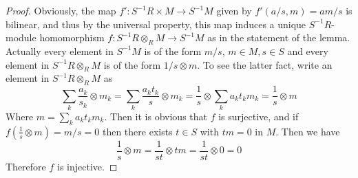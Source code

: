 \documentclass[10pt,a4paper]{amsart}
\theoremstyle{plain}
\theoremstyle{definition}
\theoremstyle{remark}
\numberwithin{equation}{subsection}
\begin{document}
\begin{proof}
Obviously, the map
$f' : S^{-1}R \times M \to S^{-1}M$ given by $f'(a/s, m) = am/s$ is
bilinear, and thus by the
universal property, this map induces a unique $S^{-1}R$-module homomorphism
$f : S^{-1}R \otimes_R M \to S^{-1}M$ as in the statement of the lemma.
Actually every element in $S^{-1}M$ is of the form $m/s$, $m\in M, s\in S$ and
every element in
$S^{-1}R \otimes_R M$ is of the form $1/s \otimes m$. To see the latter fact,
write an element in
$S^{-1}R \otimes_R M$ as
$$
\sum_k \frac{a_k}{s_k} \otimes m_k =
\sum_k \frac{a_k t_k}{s} \otimes m_k =
\frac{1}{s} \otimes \sum_k {a_k t_k}m_k = \frac{1}{s} \otimes m
$$
Where $m = \sum_k {a_k t_k}m_k$. Then it is obvious that $f$ is surjective,
and if $f(\frac{1}{s} \otimes m) = m/s = 0$ then there exists $t \in S$ with
$tm = 0$ in $M$. Then we have
$$
\frac{1}{s} \otimes m = \frac{1}{st} \otimes tm = \frac{1}{st} \otimes 0 = 0
$$
Therefore $f$ is injective.
\end{proof}
\end{document}
